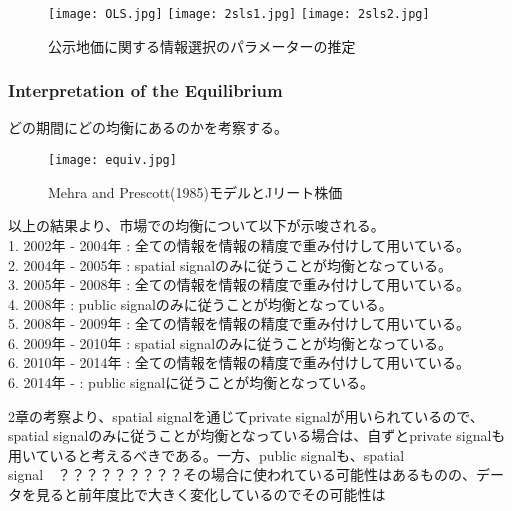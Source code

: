 \documentclass{jsarticle}
\begin{document}
\begin{figure}
\centering
\texttt{[image: OLS.jpg]}
\texttt{[image: 2sls1.jpg]}
\texttt{[image: 2sls2.jpg]}
\caption{公示地価に関する情報選択のパラメーターの推定}
\end{figure}

\subsubsection{Interpretation of the Equilibrium}
どの期間にどの均衡にあるのかを考察する。

\begin{figure}
\centering
\texttt{[image: equiv.jpg]}
\caption{Mehra and Prescott(1985)モデルとJリート株価}
\end{figure}


以上の結果より、市場での均衡について以下が示唆される。\\
1. 2002年 - 2004年 : 全ての情報を情報の精度で重み付けして用いている。\\
2. 2004年 - 2005年 : spatial signalのみに従うことが均衡となっている。\\
3. 2005年 - 2008年 : 全ての情報を情報の精度で重み付けして用いている。\\
4. 2008年 : public signalのみに従うことが均衡となっている。\\
5. 2008年 - 2009年 : 全ての情報を情報の精度で重み付けして用いている。\\
6. 2009年 - 2010年 : spatial signalのみに従うことが均衡となっている。\\
6. 2010年 - 2014年 : 全ての情報を情報の精度で重み付けして用いている。\\
6. 2014年 - : public signalに従うことが均衡となっている。

2章の考察より、spatial signalを通じてprivate signalが用いられているので、spatial signalのみに従うことが均衡となっている場合は、自ずとprivate signalも用いていると考えるべきである。一方、public signalも、spatial signal　？？？？？？？？？その場合に使われている可能性はあるものの、データを見ると前年度比で大きく変化しているのでその可能性は
\end{document}
